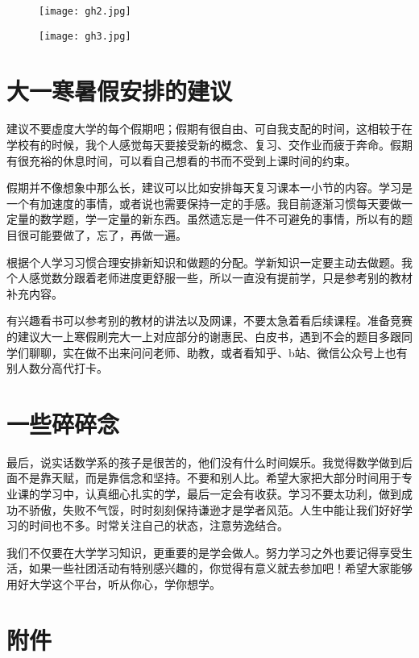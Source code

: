 \documentclass{my_paper}
\begin{document}
\begin{figure}[htbp]
	\centering
	\texttt{[image: gh2.jpg]}
\end{figure} 

\begin{figure}[htbp]
	\centering
	\texttt{[image: gh3.jpg]}
\end{figure} 

\newpage

\section{大一寒暑假安排的建议}
建议不要虚度大学的每个假期吧；假期有很自由、可自我支配的时间，这相较于在学校有的时候，我个人感觉每天要接受新的概念、复习、交作业而疲于奔命。假期有很充裕的休息时间，可以看自己想看的书而不受到上课时间的约束。

假期并不像想象中那么长，建议可以比如安排每天复习课本一小节的内容。学习是一个有加速度的事情，或者说也需要保持一定的手感。我目前逐渐习惯每天要做一定量的数学题，学一定量的新东西。虽然遗忘是一件不可避免的事情，所以有的题目很可能要做了，忘了，再做一遍。

根据个人学习习惯合理安排新知识和做题的分配。学新知识一定要主动去做题。我个人感觉数分跟着老师进度更舒服一些，所以一直没有提前学，只是参考别的教材补充内容。

有兴趣看书可以参考别的教材的讲法以及网课，不要太急着看后续课程。准备竞赛的建议大一上寒假刷完大一上对应部分的谢惠民、白皮书，遇到不会的题目多跟同学们聊聊，实在做不出来问问老师、助教，或者看知乎、b站、微信公众号上也有别人数分高代打卡。

\section{一些碎碎念}
最后，说实话数学系的孩子是很苦的，他们没有什么时间娱乐。我觉得数学做到后面不是靠天赋，而是靠信念和坚持。不要和别人比。希望大家把大部分时间用于专业课的学习中，认真细心扎实的学，最后一定会有收获。学习不要太功利，做到成功不骄傲，失败不气馁，时时刻刻保持谦逊才是学者风范。人生中能让我们好好学习的时间也不多。时常关注自己的状态，注意劳逸结合。

我们不仅要在大学学习知识，更重要的是学会做人。努力学习之外也要记得享受生活，如果一些社团活动有特别感兴趣的，你觉得有意义就去参加吧！希望大家能够用好大学这个平台，听从你心，学你想学。

\section{附件}
\end{document}
